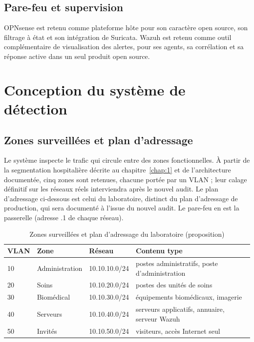 \subsection{Pare-feu et supervision}

OPNsense est retenu comme plateforme hôte pour son caractère open source, son filtrage à état et son intégration de Suricata\cite{opnsensedoc}. Wazuh est retenu comme outil complémentaire de visualisation des alertes, pour ses agents, sa corrélation et sa réponse active dans un seul produit open source\cite{wazuhdoc}.

\section{Conception du système de détection}\label{sec:conception}

\subsection{Zones surveillées et plan d'adressage}

Le système inspecte le trafic qui circule entre des zones fonctionnelles. À partir de la segmentation hospitalière décrite au chapitre~\ref{chap:1} et de l'architecture documentée, cinq zones sont retenues, chacune portée par un VLAN ; leur calage définitif sur les réseaux réels interviendra après le nouvel audit. Le plan d'adressage ci-dessous est celui du laboratoire, distinct du plan d'adressage de production, qui sera documenté à l'issue du nouvel audit. Le pare-feu en est la passerelle (adresse .1 de chaque réseau).

\begin{table}[htbp]
\centering
\small
\begin{tabular}{llll}
\hline
\textbf{VLAN} & \textbf{Zone} & \textbf{Réseau} & \textbf{Contenu type} \\
\hline
10 & Administration & 10.10.10.0/24 & postes administratifs, poste d'administration \\
20 & Soins & 10.10.20.0/24 & postes des unités de soins \\
30 & Biomédical & 10.10.30.0/24 & équipements biomédicaux, imagerie \\
40 & Serveurs & 10.10.40.0/24 & serveurs applicatifs, annuaire, serveur Wazuh \\
50 & Invités & 10.10.50.0/24 & visiteurs, accès Internet seul \\
\hline
\end{tabular}
\caption{Zones surveillées et plan d'adressage du laboratoire (proposition)}
\label{tab:vlan}
\end{table}

